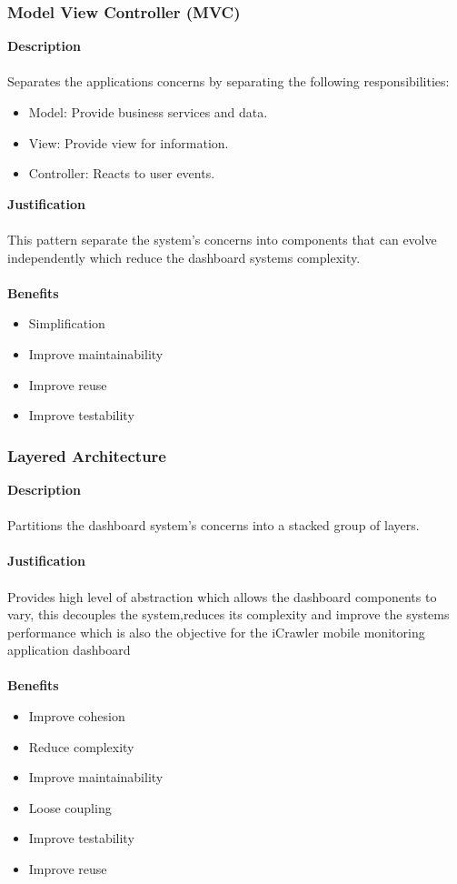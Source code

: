 \documentclass[hidelinks, 12pt, oneside]{article}
\begin{document}
    \subsubsection{Model View Controller (MVC)}
    \textbf{Description}\\\\
    Separates the applications concerns by separating the following responsibilities:
    \begin{itemize}
    \item Model: Provide business services and data.
    \item View: Provide view for information.
    \item Controller: Reacts to user events. 
    \end{itemize}
    \textbf{Justification}\\\\
    This pattern separate the system's concerns into components that can evolve independently which reduce the dashboard systems complexity.\\\\
    \textbf{Benefits}
    \begin{itemize}
    \item Simplification
    \item Improve maintainability
    \item Improve reuse
    \item Improve testability 
	\end{itemize} 
	
	\newpage
	\subsubsection{Layered Architecture}
	\textbf{Description}\\\\
	Partitions the dashboard system's concerns into a stacked group of layers.\\\\
	\textbf{Justification}\\\\
	Provides high level of abstraction which allows the dashboard components to vary, this decouples the system,reduces its complexity and improve the systems performance which is also the objective for the iCrawler mobile monitoring application dashboard\\\\
	\textbf{Benefits}
	\begin{itemize}
	\item Improve cohesion
	\item Reduce complexity
	\item Improve maintainability
	\item Loose coupling
	\item Improve testability
	\item Improve reuse
	\end{itemize}
	\newpage
\end{document}
